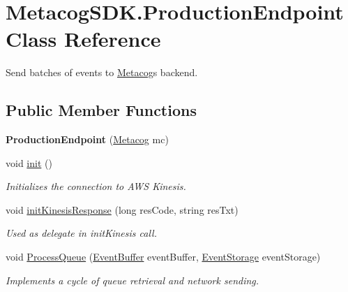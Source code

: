 \hypertarget{classMetacogSDK_1_1ProductionEndpoint}{}\section{Metacog\+S\+D\+K.\+Production\+Endpoint Class Reference}
\label{classMetacogSDK_1_1ProductionEndpoint}


Send batches of events to \hyperlink{classMetacogSDK_1_1Metacog}{Metacog}\textquotesingle{}s backend.  


\subsection*{Public Member Functions}
\begin{DoxyCompactItemize}
\item 
{\bfseries Production\+Endpoint} (\hyperlink{classMetacogSDK_1_1Metacog}{Metacog} mc)\hypertarget{classMetacogSDK_1_1ProductionEndpoint_a4f2c7ba7c615ee5f4985662f93aef13d}{}\label{classMetacogSDK_1_1ProductionEndpoint_a4f2c7ba7c615ee5f4985662f93aef13d}

\item 
void \hyperlink{classMetacogSDK_1_1ProductionEndpoint_ab2876d8ae2c940c683a02b6828506cd8}{init} ()
\begin{DoxyCompactList}\small\item\em Initializes the connection to A\+WS Kinesis. \end{DoxyCompactList}\item 
void \hyperlink{classMetacogSDK_1_1ProductionEndpoint_a42e917f279f0c16fde8f8976c78cdc40}{init\+Kinesis\+Response} (long res\+Code, string res\+Txt)
\begin{DoxyCompactList}\small\item\em Used as delegate in init\+Kinesis call. \end{DoxyCompactList}\item 
void \hyperlink{classMetacogSDK_1_1ProductionEndpoint_a26431797fe15fcba641d047440fef2f9}{Process\+Queue} (\hyperlink{classMetacogSDK_1_1EventBuffer}{Event\+Buffer} event\+Buffer, \hyperlink{classMetacogSDK_1_1EventStorage}{Event\+Storage} event\+Storage)
\begin{DoxyCompactList}\small\item\em Implements a cycle of queue retrieval and network sending. \end{DoxyCompactList}\end{DoxyCompactItemize}


